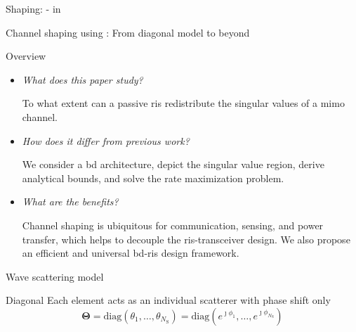 \documentclass[presentation,xcolor={table},9pt]{beamer}
\begin{document}
\begin{section}{Shaping: - in }
	\begin{frame}{Channel shaping using : From diagonal model to beyond}
		\begin{block}{Overview}
			\begin{itemize}\setlength\itemsep{20pt}
				\item \textit{What does this paper study?}

				To what extent can a passive \gls{ris} redistribute the singular values of a \gls{mimo} channel.
				\item \textit{How does it differ from previous work?}

				We consider a \gls{bd} architecture, depict the singular value region, derive analytical bounds, and solve the rate maximization problem.
				\item \textit{What are the benefits?}

				Channel shaping is ubiquitous for communication, sensing, and power transfer, which helps to decouple the \gls{ris}-transceiver design.
				We also propose an efficient and universal \gls{bd}-\gls{ris} design framework.
			\end{itemize}
		\end{block}
	\end{frame}

	\begin{frame}{Wave scattering model}
		\begin{block}{Diagonal }
			Each element acts as an individual scatterer with phase shift only
			\begin{equation*}
				\mathbf{\Theta} = \mathrm{diag}(\theta_1, \ldots, \theta_{N_\mathrm{S}}) = \mathrm{diag}(e^{\jmath \phi_1}, \ldots, e^{\jmath \phi_{N_\mathrm{S}}})
				\label{eq:diagonal_scattering_matrix}
			\end{equation*}
		\end{block}


\end{frame}
\end{section}
\end{document}
